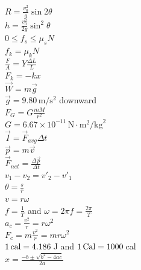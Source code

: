 \documentclass[letterpaper,addpoints,answers]{exam}
\begin{document}
\begin{multicols}{2}
 \noindent
 $R = \frac{v_0^2}{g}\sin 2\theta$ \\
 $h = \frac{v_0^2}{2 g} \sin^2 \theta$ \\
 $0 \le f_s \le \mu_s N$ \\
 $f_k = \mu_k N$ \\
 $\frac{F}{A} = Y \frac{\Delta L}{L}$ \\
 $F_k = -k x$ \\
 $\vec{W} = m \vec{g}$ \\
 $\vec{g} = 9.80\,\mbox{m}/\mbox{s}^2$ downward \\
 $F_G = G \frac{m M}{r^2}$ \\
 $G = 6.67 \times 10^{-11}\,\mbox{N}\cdot\mbox{m}^2/\mbox{kg}^2$ \\
 $\vec{I} = \vec{F}_{avg} \Delta t$ \\
 $\vec{p} = m \vec{v}$ \\
 $\vec{F}_{net} = \frac{\Delta \vec{p}}{\Delta t}$ \\
 $v_1 - v_2 = v'_2 - v'_1$ \\
 $\theta = \frac{s}{r}$ \\
 $v = r \omega$ \\
 $f = \frac{1}{T}$ and $\omega = 2 \pi f = \frac{2 \pi}{T}$ \\
 $a_c = \frac{v^2}{r} = r \omega^2$ \\
 $F_c = m\frac{v^2}{r} = m r \omega^2$ \\
 $1\,\hbox{cal} = 4.186$\,J and $1\,\hbox{Cal} = 1000$\,cal \\ 
 $x = \frac{-b \pm \sqrt{b^2 - 4 a c}}{2 a}$ \\
 \end{multicols}
\end{document}
